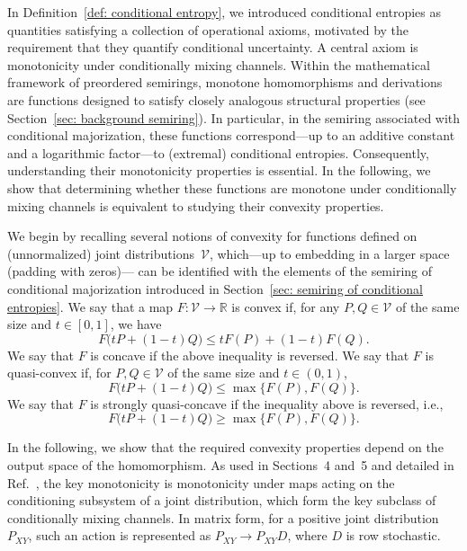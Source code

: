 \documentclass[aps,pra,11pt,onecolumn,nofootinbib,tightenlines]{revtex4-2}
\theoremstyle{definition}
\newcommand{\V}{\mathcal{V}}
\newcommand{\mb}[1]{\mathbb{#1}}
\begin{document}
In Definition~\ref{def: conditional entropy}, we introduced conditional entropies as quantities satisfying a collection of operational axioms, motivated by the requirement that they quantify conditional uncertainty. A central axiom is monotonicity under conditionally mixing channels.
Within the mathematical framework of preordered semirings, monotone homomorphisms and derivations are functions designed to satisfy closely analogous structural properties (see Section~\ref{sec: background semiring}). In particular, in the semiring associated with conditional majorization, these functions correspond—up to an additive constant and a logarithmic factor—to (extremal) conditional entropies.
Consequently, understanding their monotonicity properties is essential. In the following, we show that determining whether these functions are monotone under conditionally mixing channels is equivalent to studying their convexity properties.


We begin by recalling several notions of convexity for functions defined on
(unnormalized) joint distributions~$\mathcal V$, which—up to embedding in a larger space (padding with zeros)—
can be identified with the elements of the semiring of conditional majorization
introduced in Section~\ref{sec: semiring of conditional entropies}.
 We say that a map $F:\V\to\mb R$ is convex if, for any $P,Q\in\V$ of the same size and $t\in[0,1]$, we have
\begin{equation}
F\big(tP+(1-t)Q\big)\leq tF(P)+(1-t)F(Q).
\end{equation}
We say that $F$ is concave if the above inequality is reversed. We say that $F$ is quasi-convex if, for $P,Q\in\V$ of the same size and $t\in(0,1)$,
\begin{equation}
F\big(tP+(1-t)Q\big)\leq\max\{F(P),F(Q)\}.
\end{equation}
We say that $F$ is strongly quasi-concave if the inequality above is reversed, i.e.,
\begin{equation}
\label{eq: def strongly quasi-conc}
    F\big(tP+(1-t)Q\big)\geq\max\{F(P),F(Q)\}.
\end{equation}

 In the following, we show that the required convexity properties depend on the output space of the homomorphism. As used in Sections~4 and~5 and detailed in Ref.~\cite{rubboli2026parametersFull}, the key monotonicity is monotonicity under maps acting on the conditioning subsystem of a joint distribution, which form the key subclass of conditionally mixing channels. In matrix form, for a positive joint distribution $P_{XY}$, such an action is represented as $P_{XY}\rightarrow P_{XY}D$, where $D$ is row stochastic.
\end{document}

